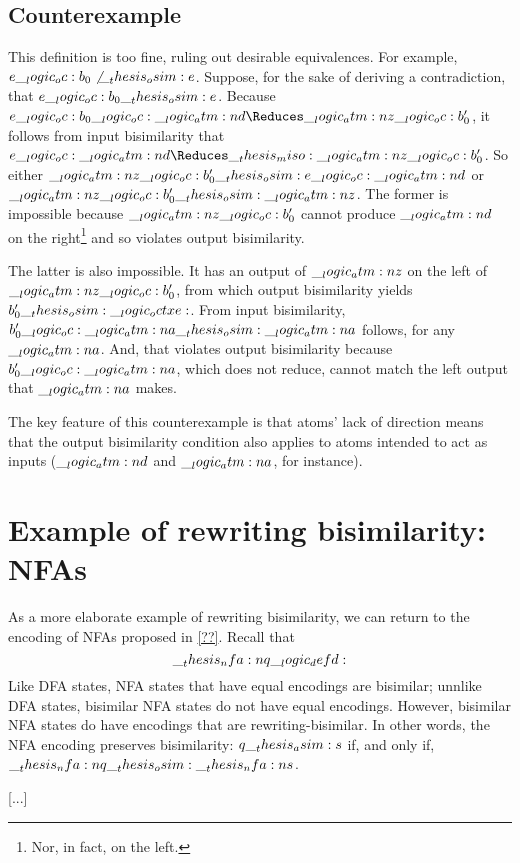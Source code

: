 \subsection{Counterexample}


This definition is too fine, ruling out desirable equivalences.
For example, $e \__logic_oc: b_0 \not\__thesis_osim: e$.
Suppose, for the sake of deriving a contradiction, that $e \__logic_oc: b_0 \__thesis_osim: e$.
Because $e \oc b_0 \oc \atm{d} \Reduces \atm{z} \oc b'_0$, it follows from input bisimilarity that $e \oc \atm{d} \Reduces\miso \atm{z} \oc b'_0$.
So either $\__logic_atm:n {z} \__logic_oc: b'_0 \__thesis_osim: e \__logic_oc: \__logic_atm:n {d}$ or $\__logic_atm:n {z} \__logic_oc: b'_0 \__thesis_osim: \__logic_atm:n {z}$.
The former is impossible because $\__logic_atm:n {z} \__logic_oc: b'_0$ cannot produce $\__logic_atm:n {d}$ on the right\footnote{Nor, in fact, on the left.} and so violates output bisimilarity.

The latter is also impossible.
It has an output of $\__logic_atm:n {z}$ on the left of $\__logic_atm:n {z} \__logic_oc: b'_0$, from which output bisimilarity yields $b'_0 \__thesis_osim: \__logic_octxe:$.
From input bisimilarity, $b'_0 \__logic_oc: \__logic_atm:n {a} \__thesis_osim: \__logic_atm:n {a}$ follows, for any $\__logic_atm:n {a}$.
And, that violates output bisimilarity because $b'_0 \__logic_oc: \__logic_atm:n {a}$, which does not reduce, cannot match the left output that $\__logic_atm:n {a}$ makes.

The key feature of this counterexample is that atoms' lack of direction means that the output bisimilarity condition also applies to atoms intended to act as inputs ($\__logic_atm:n {d}$ and $\__logic_atm:n {a}$, for instance).


\section{Example of rewriting bisimilarity: \Aclp*{NFA}}

As a more elaborate example of rewriting bisimilarity, we can return to the encoding of \acp{NFA} proposed in \cref{??}.
Recall that 
\begin{equation*}
  \__thesis_nfa:n {q} \__logic_defd:
\end{equation*}
Like \ac{DFA} states, \ac{NFA} states that have equal encodings are bisimilar; unnlike \ac{DFA} states, bisimilar \ac{NFA} states do not have equal encodings. 
However, bisimilar \ac{NFA} states do have encodings that are rewriting-bisimilar.
In other words, the \ac{NFA} encoding preserves bisimilarity: $q \__thesis_asim: s$ if, and only if, $\__thesis_nfa:n {q} \__thesis_osim: \__thesis_nfa:n {s}$.

[...]

